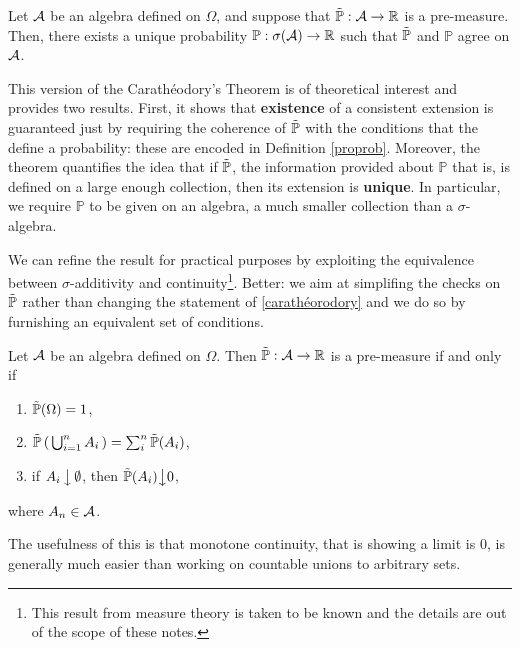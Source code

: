 \goodbreak\begin{my_theorem}
	\label{carathéorodory}
	Let $\mathcal{A}$ be an algebra defined on $\Omega$, and suppose that $\tilde{\mathbb{P}} : \mathcal{A} \to \mathbb{R}$ is a pre-measure.	Then, there exists a unique probability $\mathbb{P}: \sigma ( \mathcal{A} ) \to \mathbb{R}$ such that $\tilde{\mathbb{P}}$ and $\mathbb{P}$ agree on $\mathcal{A}$.
\end{my_theorem}
\begin{my_remark}
	This version of the Carathéodory's Theorem is of theoretical interest and provides two results.
	First, it shows that \textbf{existence} of a consistent extension is guaranteed just by requiring the coherence of $\tilde{\mathbb{P}}$ with the conditions that the define a probability: these are encoded in Definition \ref{proprob}.
	Moreover, the theorem quantifies the idea that if $\tilde{\mathbb{P}}$, the information provided about $\mathbb{P}$ that is, is defined on a large enough collection, then its extension is \textbf{unique}. 
	In particular, we require $\mathbb{P}$ to be given on an algebra, a much smaller collection than a $\sigma$-algebra.
\end{my_remark}

We can refine the result for practical purposes by exploiting the equivalence between $\sigma$-additivity and continuity\footnote{This result from measure theory is taken to be known and the details are out of the scope of these notes.}. 
Better: we aim at simplifing the checks on $\tilde{\mathbb{P}}$ rather than changing the statement of \ref{carathéorodory} and we do so by furnishing an equivalent set of conditions.
\goodbreak\begin{my_lemma}
	Let $\mathcal{A}$ be an algebra defined on $\Omega$. Then $\tilde{\mathbb{P}}:\mathcal{A}\to\mathbb{R}$ is a pre-measure if and only if
	\begin{enumerate}
		\item $\tilde{\mathbb{P}}(\Omega)=1$,
		\item $\tilde{\mathbb{P}} \left( \, \bigcup^n_{i=1} A_i \, \right) = \sum^n_i \tilde{\mathbb{P}}(A_i)$,
		\item if $A_i \, \big \downarrow \, \emptyset$, then $\tilde{\mathbb{P}}(A_i) \big \downarrow0$,
	\end{enumerate}
	where $A_n\in\mathcal{A}$.
\end{my_lemma}
\begin{my_remark}
	The usefulness of this is that monotone continuity, that is showing a limit is $0$, is generally much easier than working on countable unions to arbitrary sets.
\end{my_remark}

